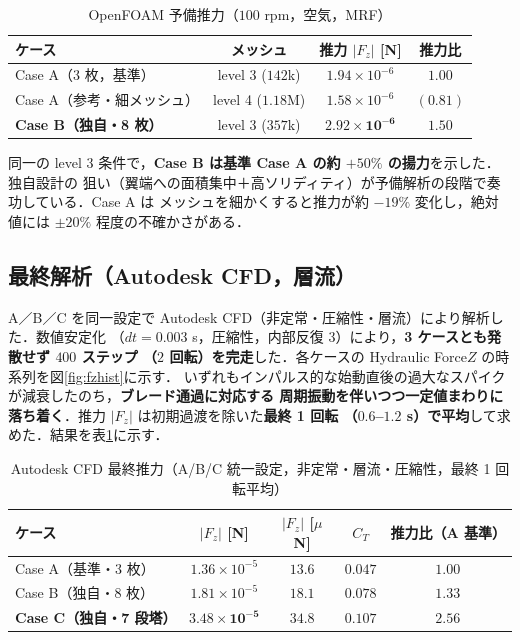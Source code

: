 \documentclass[a4paper,11pt]{jsarticle}
\begin{document}
\begin{table}[htbp]
  \centering
  \caption{OpenFOAM 予備推力（$100$ rpm，空気，MRF）}
  \begin{tabular}{l|ccc}
    \hline
    ケース & メッシュ & 推力 $|F_z|$ [N] & 推力比 \\
    \hline
    Case A（3 枚，基準） & level 3 ($142$k) & $1.94\times10^{-6}$ & $1.00$ \\
    Case A（参考・細メッシュ） & level 4 ($1.18$M) & $1.58\times10^{-6}$ & $(0.81)$ \\
    \textbf{Case B（独自・8 枚）} & level 3 ($357$k) & $\boldsymbol{2.92\times10^{-6}}$ & $\boldsymbol{1.50}$ \\
    \hline
  \end{tabular}
\end{table}

同一の level 3 条件で，\textbf{Case B は基準 Case A の約 $+50\%$ の揚力}を示した．独自設計の
狙い（翼端への面積集中＋高ソリディティ）が予備解析の段階で奏功している．Case A は
メッシュを細かくすると推力が約 $-19\%$ 変化し，絶対値には $\pm20\%$ 程度の不確かさがある．

\subsection{最終解析（Autodesk CFD，層流）}

A／B／C を同一設定で Autodesk CFD（非定常・圧縮性・層流）により解析した．数値安定化
（$dt=0.003$ s，圧縮性，内部反復 3）により，\textbf{3 ケースとも発散せず $400$ ステップ
（$2$ 回転）を完走}した．各ケースの Hydraulic Force$Z$ の時系列を図\ref{fig:fzhist}に示す．
いずれもインパルス的な始動直後の過大なスパイクが減衰したのち，\textbf{ブレード通過に対応する
周期振動を伴いつつ一定値まわりに落ち着く}．推力 $|F_z|$ は初期過渡を除いた\textbf{最終 1 回転
（$0.6$--$1.2$ s）で平均}して求めた．結果を表\ref{tab:cfd}に示す．

\begin{table}[htbp]
  \centering
  \caption{Autodesk CFD 最終推力（A/B/C 統一設定，非定常・層流・圧縮性，最終 1 回転平均）}
  \label{tab:cfd}
  \begin{tabular}{l|cccc}
    \hline
    ケース & $|F_z|$ [N] & $|F_z|$ [$\mu$N] & $C_T$ & 推力比（A 基準） \\
    \hline
    Case A（基準・3 枚） & $1.36\times10^{-5}$ & $13.6$ & $0.047$ & $1.00$ \\
    Case B（独自・8 枚） & $1.81\times10^{-5}$ & $18.1$ & $0.078$ & $1.33$ \\
    \textbf{Case C（独自・7 段塔）} & $\boldsymbol{3.48\times10^{-5}}$ & $\boldsymbol{34.8}$ & $\boldsymbol{0.107}$ & $\boldsymbol{2.56}$ \\
    \hline
  \end{tabular}
\end{table}
\end{document}
